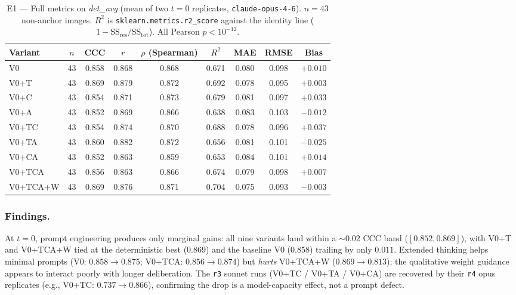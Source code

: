 \begin{table}[t]
  \centering
  \caption{E1 --- Full metrics on \emph{det\_avg} (mean of two $t=0$
    replicates, \texttt{claude-opus-4-6}). $n=43$ non-anchor images.
    $R^2$ is \texttt{sklearn.metrics.r2\_score} against the identity line
    ($1 - \mathrm{SS}_\mathrm{res}/\mathrm{SS}_\mathrm{tot}$).
    All Pearson $p < 10^{-12}$.}
  \label{tab:e1-full}
  \small
  \begin{tabular*}{\textwidth}{@{\extracolsep{\fill}}lcccccccc@{}}
    \toprule
    Variant & $n$ & CCC & $r$ & $\rho$ (Spearman) & $R^2$ & MAE & RMSE & Bias\\
    \midrule
    V0        & 43 & 0.858 & 0.868 & 0.868 & 0.671 & 0.080 & 0.098 & $+0.010$\\
    V0+T      & 43 & 0.869 & 0.879 & 0.872 & 0.692 & 0.078 & 0.095 & $+0.003$\\
    V0+C      & 43 & 0.854 & 0.871 & 0.873 & 0.679 & 0.081 & 0.097 & $+0.033$\\
    V0+A      & 43 & 0.852 & 0.869 & 0.866 & 0.638 & 0.083 & 0.103 & $-0.012$\\
    V0+TC     & 43 & 0.854 & 0.874 & 0.870 & 0.688 & 0.078 & 0.096 & $+0.037$\\
    V0+TA     & 43 & 0.860 & 0.882 & 0.872 & 0.656 & 0.081 & 0.101 & $-0.025$\\
    V0+CA     & 43 & 0.852 & 0.863 & 0.859 & 0.653 & 0.084 & 0.101 & $+0.014$\\
    V0+TCA    & 43 & 0.856 & 0.863 & 0.866 & 0.674 & 0.079 & 0.098 & $+0.007$\\
    V0+TCA+W  & 43 & 0.869 & 0.876 & 0.871 & 0.704 & 0.075 & 0.093 & $-0.003$\\
    \bottomrule
  \end{tabular*}
\end{table}

\subsubsection{Findings.}
At $t=0$, prompt engineering produces only marginal gains: all nine variants
land within a $\sim\!0.02$ CCC band ($[0.852, 0.869]$), with V0+T and
V0+TCA+W tied at the deterministic best ($0.869$) and the baseline V0
($0.858$) trailing by only $0.011$. Extended thinking helps minimal prompts
(V0: $0.858 \to 0.875$; V0+TCA: $0.856 \to 0.874$) but \emph{hurts}
V0+TCA+W ($0.869 \to 0.813$); the qualitative weight guidance appears to
interact poorly with longer deliberation. The \texttt{r3} sonnet runs
(V0+TC / V0+TA / V0+CA) are recovered by their \texttt{r4} opus replicates
(e.g., V0+TC: $0.737 \to 0.866$), confirming the drop is a model-capacity
effect, not a prompt defect.

